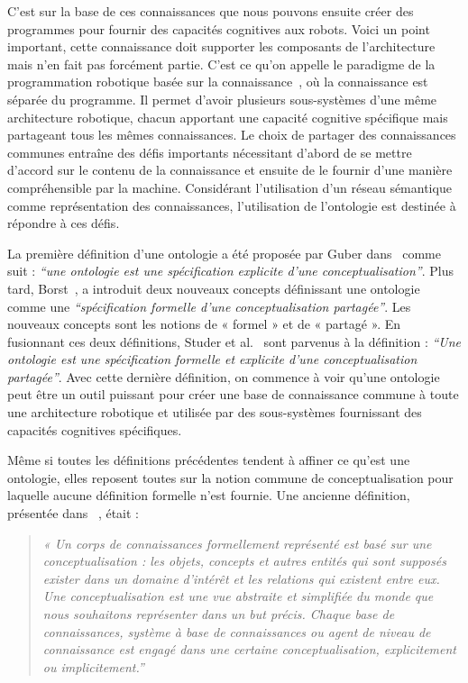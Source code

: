 C'est sur la base de ces connaissances que nous pouvons ensuite créer des programmes pour fournir des capacités cognitives aux robots. Voici un point important, cette connaissance doit supporter les composants de l'architecture mais n'en fait pas forcément partie. C'est ce qu'on appelle le paradigme de la programmation robotique basée sur la connaissance~\cite{beetz_2012_cognition}, où la connaissance est séparée du programme. Il permet d'avoir plusieurs sous-systèmes d'une même architecture robotique, chacun apportant une capacité cognitive spécifique mais partageant tous les mêmes connaissances. Le choix de partager des connaissances communes entraîne des défis importants nécessitant d'abord de se mettre d'accord sur le contenu de la connaissance et ensuite de le fournir d'une manière compréhensible par la machine. Considérant l'utilisation d'un réseau sémantique comme représentation des connaissances, l'utilisation de l'ontologie est destinée à répondre à ces défis. 

La première définition d'une ontologie a été proposée par Guber dans~\cite{guber_1993_translational} comme suit : \textit{``une ontologie est une spécification explicite d'une conceptualisation''}. Plus tard, Borst~\cite{borst_1999_construction}, a introduit deux nouveaux concepts définissant une ontologie comme une \textit{``spécification formelle d'une conceptualisation partagée''}. Les nouveaux concepts sont les notions de « formel » et de « partagé ». En fusionnant ces deux définitions, Studer et al.~\cite{studer_1998_knowledge} sont parvenus à la définition : \textit{``Une ontologie est une spécification formelle et explicite d'une conceptualisation partagée''}. Avec cette dernière définition, on commence à voir qu'une ontologie peut être un outil puissant pour créer une base de connaissance commune à toute une architecture robotique et utilisée par des sous-systèmes fournissant des capacités cognitives spécifiques.

Même si toutes les définitions précédentes tendent à affiner ce qu'est une ontologie, elles reposent toutes sur la notion commune de conceptualisation pour laquelle aucune définition formelle n'est fournie. Une ancienne définition, présentée dans ~\cite{genesereth_1987_logical}, était :

\begin{quote} 
\centering 
\textit{
« Un corps de connaissances formellement représenté est basé sur une conceptualisation : les objets, concepts et autres entités qui sont supposés exister dans un domaine d'intérêt et les relations qui existent entre eux. Une conceptualisation est une vue abstraite et simplifiée du monde que nous souhaitons représenter dans un but précis. Chaque base de connaissances, système à base de connaissances ou agent de niveau de connaissance est engagé dans une certaine conceptualisation, explicitement ou implicitement.''}
\end{quote}

